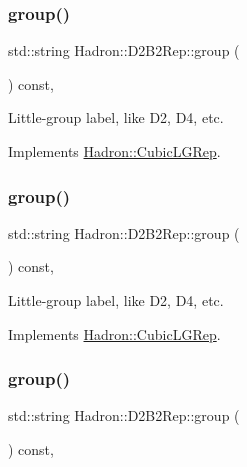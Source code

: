 \subsubsection{\texorpdfstring{group()}{group()}\hspace{0.1cm}{\footnotesize\ttfamily [3/5]}}
{\footnotesize\ttfamily std\+::string Hadron\+::\+D2\+B2\+Rep\+::group (\begin{DoxyParamCaption}{ }\end{DoxyParamCaption}) const\hspace{0.3cm}{\ttfamily [inline]}, {\ttfamily [virtual]}}

Little-\/group label, like D2, D4, etc. 

Implements \mbox{\hyperlink{structHadron_1_1CubicLGRep_a9bdb14b519a611d21379ed96a3a9eb41}{Hadron\+::\+Cubic\+L\+G\+Rep}}.

\mbox{\label{structHadron_1_1D2B2Rep_a9fb4cee66698b4d18b47ed2f4aa9ff2f}} 
\subsubsection{\texorpdfstring{group()}{group()}\hspace{0.1cm}{\footnotesize\ttfamily [4/5]}}
{\footnotesize\ttfamily std\+::string Hadron\+::\+D2\+B2\+Rep\+::group (\begin{DoxyParamCaption}{ }\end{DoxyParamCaption}) const\hspace{0.3cm}{\ttfamily [inline]}, {\ttfamily [virtual]}}

Little-\/group label, like D2, D4, etc. 

Implements \mbox{\hyperlink{structHadron_1_1CubicLGRep_a9bdb14b519a611d21379ed96a3a9eb41}{Hadron\+::\+Cubic\+L\+G\+Rep}}.

\mbox{\label{structHadron_1_1D2B2Rep_a9fb4cee66698b4d18b47ed2f4aa9ff2f}} 
\subsubsection{\texorpdfstring{group()}{group()}\hspace{0.1cm}{\footnotesize\ttfamily [5/5]}}
{\footnotesize\ttfamily std\+::string Hadron\+::\+D2\+B2\+Rep\+::group (\begin{DoxyParamCaption}{ }\end{DoxyParamCaption}) const\hspace{0.3cm}{\ttfamily [inline]}, {\ttfamily [virtual]}}

